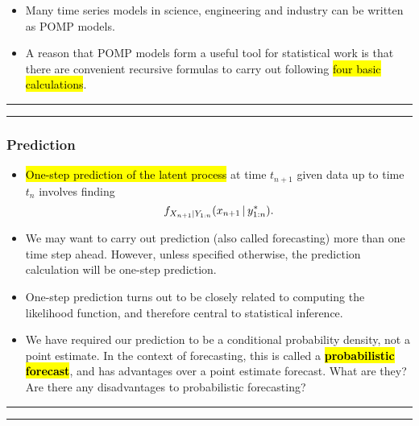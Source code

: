 \documentclass[]{article}
\begin{document}
\begin{itemize}
\item
  Many time series models in science, engineering and industry can be
  written as POMP models.
\item
  A reason that POMP models form a useful tool for statistical work is
  that there are convenient recursive formulas to carry out following
  \hl{four basic calculations}.
\end{itemize}

\begin{center}\rule{0.5\linewidth}{\linethickness}\end{center}

\begin{center}\rule{0.5\linewidth}{\linethickness}\end{center}

\subsubsection{Prediction}\label{prediction}

\begin{itemize}
\item
  \hl{One-step prediction of the latent process} at time \(t_{n+1}\) given
  data up to time \(t_n\) involves finding
  \[ f_{X_{n+1}|Y_{1:n}}(x_{n+1}{\, | \,} y_{1:n}^*).\]
\item
  We may want to carry out prediction (also called forecasting) more
  than one time step ahead. However, unless specified otherwise, the
  prediction calculation will be one-step prediction.
\item
  One-step prediction turns out to be closely related to computing the
  likelihood function, and therefore central to statistical inference.
\item
  We have required our prediction to be a conditional probability
  density, not a point estimate. In the context of forecasting, this is
  called a \hl{\textbf{probabilistic forecast}}, and has advantages over a
  point estimate forecast. What are they? Are there any disadvantages to
  probabilistic forecasting?
  
\end{itemize}

\begin{center}\rule{0.5\linewidth}{\linethickness}\end{center}

\begin{center}\rule{0.5\linewidth}{\linethickness}\end{center}
\end{document}
